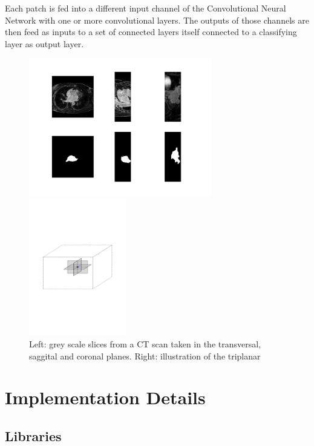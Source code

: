 \noindent Each patch is fed into a different input channel of the Convolutional Neural Network with one or more convolutional layers. The outputs of those channels are then feed as inputs to a set of connected layers itself connected to a classifying layer as output layer.

\begin{figure}
\centering
\begin{minipage}{0.45\textwidth}
\centering
\includegraphics[trim=3cm 1.5cm 3cm 1.5cm, clip=true, height=60mm]{Chapter3/example_slice.png}
\end{minipage}\hfill
\begin{minipage}{0.45\textwidth}
\centering
\includegraphics[trim=2cm 8cm 2cm 8cm, clip=true, height=60mm]{Chapter3/triplanar.pdf}
\end{minipage}
\caption{Left: grey scale slices from a CT scan taken in the transversal, saggital and coronal planes. Right: illustration of the triplanar}
\end{figure}

\section{Implementation Details}

\subsection{Libraries}

